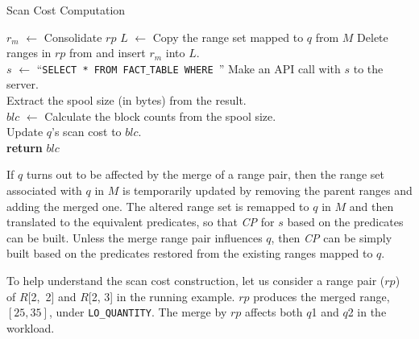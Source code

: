 \documentclass[runningheads]{comsis2}
\def\range#1{$[{#1}]$}
\begin{document}
\begin{algorithm}[t]
\caption{Scan Cost Computation}
\label{algo:comp_scan_cost}
{
	$r_{m}$ $\leftarrow$ Consolidate $rp$ \;
	$L$ $\leftarrow$ Copy the range set mapped to $q$ from $M$\; 
	Delete ranges in $rp$ from and insert $r_{m}$ into $L$. \\
	$s$ $\leftarrow$ ``{\tt SELECT * FROM FACT$\_$TABLE WHERE }'' \;
	Make an API call with $s$ to the server. \\
	Extract the spool size (in bytes) from the result. \\
	$blc$ $\leftarrow$ Calculate the block counts from the spool size. \\
	Update $q$'s scan cost to $blc$. \\
	{\bf return} $blc$ \;
}
\end{algorithm}

If $q$ turns out to be affected by the merge of a range pair, 
then the range set associated with $q$ in $M$ is temporarily updated 
by removing the parent ranges and adding the merged one. 
The altered range set is remapped to $q$ in $M$ and then 
translated to the equivalent predicates, 
so that {\it CP} for $s$ based on the predicates can be built.
Unless the merge range pair influences $q$, then 
{\it CP} can be simply built based on the 
predicates restored from the existing ranges mapped to $q$.

To help understand the scan cost construction, let us 
consider a range pair ($rp$) of \hbox{$R$[2, 2]} and $R$[2, 3] in the running example. 
$rp$ produces the merged range, \range{25, 35}, \hbox{under} {\tt LO\_QUANTITY}. 
The merge by $rp$ affects both $q$1 and $q$2 in the workload.  
\end{document}
